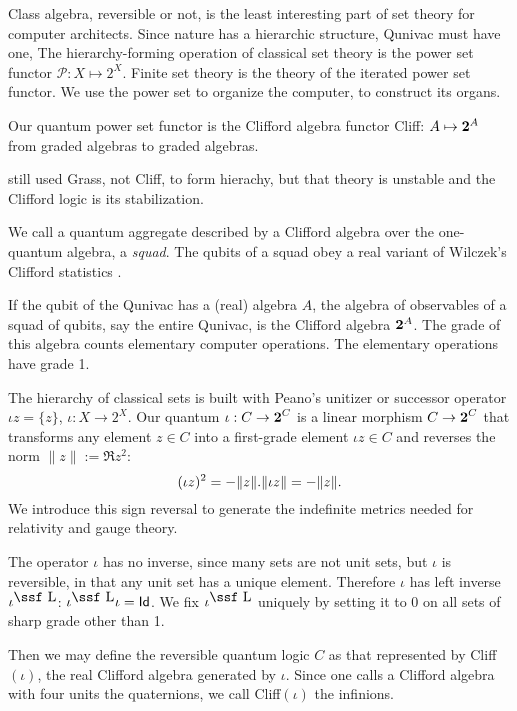 \documentclass[a4paper,11pt]{article}
\def\2#1{\mbox{\bf #1}}
\def\3#1{{\mathcal #1}}
\def\5#1{\mbox{\sf #1}} %
\def\6#1{\mbox{\ssf #1}}
\begin{document}
Class algebra, reversible or not,
is the least 
interesting part of set theory for computer architects.
Since nature has a hierarchic 
structure,
Qunivac must have one,
The hierarchy-forming
operation
of classical set theory
is the power set functor $\3P: X\mapsto 2^X$. 
Finite set theory is the theory of the iterated power set functor.
We use the power set  to organize the computer,
to construct its organs.

Our quantum power set functor is
 the Clifford algebra functor Cliff: $A\mapsto {\bf 2}^A$
from graded algebras to graded algebras.

\cite{FINKELSTEIN1996} still used Grass, not 
Cliff, to form hierachy,
but that theory is unstable
and the Clifford logic is its stabilization.

We call a quantum aggregate described
by a Clifford algebra over 
the one-quantum algebra, a {\em squad}.
The qubits of a squad obey 
a real variant of Wilczek's Clifford statistics
\cite{WILCZEK1982,
NAYAK1996,WILCZEK1998}.


If the qubit of the Qunivac has
a (real) algebra $A$,
the algebra of observables of a squad of qubits,
say the entire Qunivac,
is the Clifford algebra ${\bf 2}^A$\/.
The  grade of this algebra 
counts elementary computer operations.
The elementary operations have grade 1.

The hierarchy of classical sets is built with
Peano's unitizer or successor operator $\iota z=\{z\}$,
$\iota: X\to 2^X$.
Our quantum $\iota: C\to  {\22}^C$
is a linear morphism $C\to {\22}^C$
that
transforms any element $z \in C$ into a
first-grade element $\iota  z\in C$
and  reverses the  norm 
$\|z\| :=\Re z^2$:
\begin{equation}
 (\iota z)^2 =-\|z\|\/. \|\iota z\|=-\|z\|\/.
\end{equation}
We introduce this sign reversal to generate
the indefinite metrics needed 
for relativity and gauge theory.

The operator  $\iota$ has no inverse,
since many sets are not unit sets,
but $\iota$ is reversible, in that
any unit set has a unique element.
Therefore $\iota$ has left inverse $\iota^{\6L}$:
$\iota^{\6L}\iota=\5I\5d$.
We fix $\iota^{\6L}$ uniquely
by setting it to 0 on all sets of sharp grade
other than 1.

Then we may define the reversible quantum logic 
$C$ as that represented by Cliff$(\iota)$,
the real Clifford algebra
generated by $\iota$.
Since one calls a Clifford algebra with four units  the quaternions,
we call Cliff$(\iota)$ the infinions.
\end{document}
